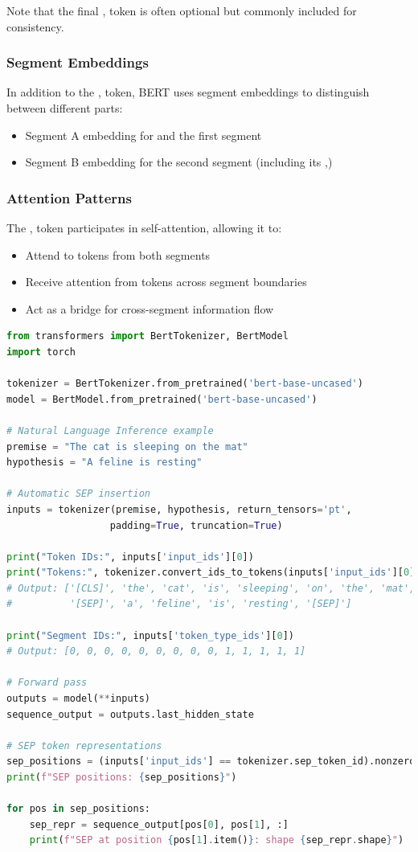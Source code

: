 Note that the final \sep{} token is often optional but commonly included for consistency.

\subsubsection{Segment Embeddings}
In addition to the \sep{} token, BERT uses segment embeddings to distinguish between different parts:
\begin{itemize}
\item Segment A embedding for \cls{} and the first segment
\item Segment B embedding for the second segment (including its \sep{})
\end{itemize}

\subsubsection{Attention Patterns}
The \sep{} token participates in self-attention, allowing it to:
\begin{itemize}
\item Attend to tokens from both segments
\item Receive attention from tokens across segment boundaries
\item Act as a bridge for cross-segment information flow
\end{itemize}

\begin{example}
\begin{lstlisting}[language=Python]
from transformers import BertTokenizer, BertModel
import torch

tokenizer = BertTokenizer.from_pretrained('bert-base-uncased')
model = BertModel.from_pretrained('bert-base-uncased')

# Natural Language Inference example
premise = "The cat is sleeping on the mat"
hypothesis = "A feline is resting"

# Automatic SEP insertion
inputs = tokenizer(premise, hypothesis, return_tensors='pt', 
                  padding=True, truncation=True)

print("Token IDs:", inputs['input_ids'][0])
print("Tokens:", tokenizer.convert_ids_to_tokens(inputs['input_ids'][0]))
# Output: ['[CLS]', 'the', 'cat', 'is', 'sleeping', 'on', 'the', 'mat', 
#          '[SEP]', 'a', 'feline', 'is', 'resting', '[SEP]']

print("Segment IDs:", inputs['token_type_ids'][0])
# Output: [0, 0, 0, 0, 0, 0, 0, 0, 0, 1, 1, 1, 1, 1]

# Forward pass
outputs = model(**inputs)
sequence_output = outputs.last_hidden_state

# SEP token representations
sep_positions = (inputs['input_ids'] == tokenizer.sep_token_id).nonzero()
print(f"SEP positions: {sep_positions}")

for pos in sep_positions:
    sep_repr = sequence_output[pos[0], pos[1], :]
    print(f"SEP at position {pos[1].item()}: shape {sep_repr.shape}")
\end{lstlisting}
\end{example}

